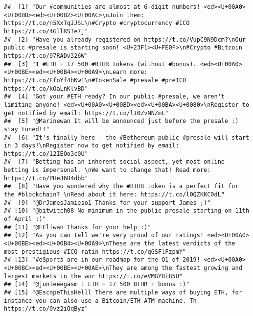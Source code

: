 \documentclass[]{article}
\begin{document}
\begin{verbatim}
##  [1] "Our #communities are almost at 6-digit numbers! <ed><U+00A0><U+00BD><ed><U+00B2><U+00AC>\nJoin them: https://t.co/n5XxTqJJSL\n#Crypto #cryptocurrency #ICO https://t.co/4GllRSTe7j"
##  [2] "Have you already registered on https://t.co/VupC9N9Dcm?\nOur public #presale is starting soon! <U+23F1><U+FE0F>\n#Crypto #Bitcoin https://t.co/97RADv326W"    
##  [3] "1 #ETH = 17 500 #BTHR tokens (without #bonus). <ed><U+00A0><U+00BE><ed><U+00B4><U+00A9>\nLearn more: https://t.co/EfoYf4bKw1\n#TokenSale #presale #preICO https://t.co/kOaLnKlvBD"
##  [4] "Got your #ETH ready? In our public #presale, we aren't limiting anyone! <ed><U+00A0><U+00BD><ed><U+00BA><U+0080>\nRegister to get notified by email: https://t.co/lI0ZvNNZmE"
##  [5] "@Marinewan It will be announced just before the presale :) stay tuned!!"                                                                                       
##  [6] "It's finally here - the #Bethereum public #presale will start in 3 days!\nRegister now to get notified by email: https://t.co/12IEOo3c0U"                     
##  [7] "Betting has an inherent social aspect, yet most online betting is impersonal. \nWe want to change that! Read more: https://t.co/PHeJ6B4dbb"                   
##  [8] "Have you wondered why the #BTHR token is a perfect fit for the #blockchain? \nRead about it here: https://t.co/l0QZKKC0dL"                                    
##  [9] "@DrJamesJamieso1 Thanks for your support James ;)"                                                                                                             
## [10] "@bitwitch08 No minimum in the public presale starting on 11th of April :)"                                                                                     
## [11] "@EEliwan Thanks for your help :)"                                                                                                                              
## [12] "As you can tell we're very proud of our ratings! <ed><U+00A0><U+00BE><ed><U+00B4><U+00A9>\nThese are the latest verdicts of the most prestigious #ICO ratin https://t.co/qGSFlFzpmY"
## [13] "#eSports are in our roadmap for the Q1 of 2019! <ed><U+00A0><U+00BC><ed><U+00BE><U+00AE>\nThey are among the fastest growing and largest markets in the wor https://t.co/eVMGY8i85U"
## [14] "@junieeegasm 1 ETH = 17 500 BTHR + bonus :)"                                                                                                                   
## [15] "@EscapeThisHelll There are multiple ways of buying ETH, for instance you can also use a Bitcoin/ETH ATM machine. Th https://t.co/0vz2iQqByz"                  

\end{verbatim}
\end{document}
